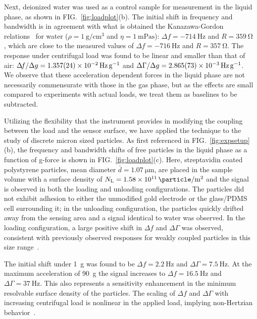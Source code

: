 \documentclass[floatfix,superscriptaddress,a4paper,twocolumn]{revtex4-1}
\newcommand{\Figure}[1]{FIG.~\ref{#1}}
\newcommand{\df}{\Delta\!f}
\newcommand{\dg}{\Delta\Gamma}
\begin{document}
Next, deionized water was used as a control sample for measurement in the
liquid phase, as shown in \Figure{fig:loadplot}(b).  The initial shift in
frequency and bandwidth is in agreement with what is obtained the Kanazawa-Gordon
relations~\cite{kanazawa1985frequency} for water
($\rho=\SI{1}{\gram\per\centi\meter\cubed}$ and
$\eta=\SI{1}{\milli\pascal\second}$): $\df = \SI{-714}{\hertz}$ and
$R=\SI{359}{\ohm}$, which are close to the measured values of $\df =
\SI{-716}{\hertz}$ and $R=\SI{357}{\ohm}$.  The response under centrifugal
load was found to be linear and smaller than that of air: $\df/\Delta g=
\SI{1.357+-0.024e-2}{\hertz \per\g}$ and $\dg/\Delta g=
\SI{2.865+-0.073e-3}{\hertz\per\g}$.  We observe that these acceleration
dependent forces in the liquid phase are not necessarily commensurate with
those in the gas phase, but as the effects are small compared to
experiments with actual loads, we treat them as baselines to be
subtracted.

Utilizing the flexibility that the instrument provides in modifying the
coupling between the load and the sensor surface, we have applied the
technique to the study of discrete micron sized particles.  As first
referenced in \Figure{fig:expsetup}(b), the frequency and bandwidth shifts
of free particles in the liquid phase as a function of g-force is shown in
\Figure{fig:loadplot}(c).  Here, streptavidin coated polystyrene particles,
mean diameter $\bar{d}=\SI{1.07}{\micro\meter}$, are placed in the sample volume with
a surface density of
$N_\mathrm{L}=\SI{1.58e11}{\particle\per\meter\squared}$ and the signal is
observed in both the loading and unloading configurations.
The particles
did not exhibit adhesion to either the unmodified gold electrode or the
glass/PDMS cell surrounding it; in the unloading configuration, the particles
quickly drifted away from the sensing area and a signal identical to water
was observed.  In the loading configuration, a large positive
shift in $\df$ and $\dg$ was observed, consistent with
previously observed responses for weakly coupled particles in this size
range~\cite{johannsman2007contacts}.  

The initial shift under \SI{1}{g} was found to be $\df=
\SI{2.2}{\hertz}$ and $\dg=\SI{7.5}{\hertz}$.  At the maximum acceleration of \SI{90}{g} the
signal increases to $\df = \SI{16.5}{\hertz}$ and $\dg=\SI{37}{\hertz}$. This also
represents a sensitivity enhancement in the minimum resolvable surface
density of the particles.  The scaling of $\df$ and $\dg$ with increasing
centrifugal load is nonlinear in the applied load, implying non-Hertzian
behavior~\cite{borovsky2001measuring}.
\end{document}
